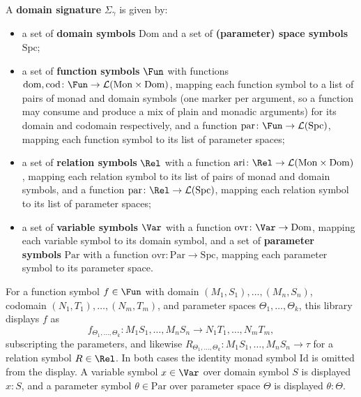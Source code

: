 \begin{definition}
\label{def:domain-signature}
\leanok
A \textbf{domain signature} $\Sigma_\gamma$ is given by:
\begin{itemize}
\item a set of \textbf{domain symbols} $\mathrm{Dom}$ and a set of
  \textbf{(parameter) space symbols} $\mathrm{Spc}$;
\item a set of \textbf{function symbols} $\Fun$ with functions
  $\mathrm{dom}, \mathrm{cod} \colon \Fun \to \mathcal L(\mathrm{Mon}
  \times \mathrm{Dom})$, mapping each function symbol to a list of pairs
  of monad and domain symbols (one marker per argument, so a function
  may consume and produce a mix of plain and monadic arguments) for
  its domain and codomain respectively, and a function
  $\mathrm{par} \colon \Fun \to \mathcal L(\mathrm{Spc})$, mapping each
  function symbol to its list of parameter spaces;
\item a set of \textbf{relation symbols} $\Rel$ with a function
  $\mathrm{ari} \colon \Rel \to \mathcal L(\mathrm{Mon} \times \mathrm{Dom})$,
  mapping each relation symbol to its list of pairs of monad and
  domain symbols, and a function
  $\mathrm{par} \colon \Rel \to \mathcal L(\mathrm{Spc})$, mapping each
  relation symbol to its list of parameter spaces;
\item a set of \textbf{variable symbols} $\Var$ with a function
  $\mathrm{ovr} \colon \Var \to \mathrm{Dom}$, mapping each variable symbol to
  its domain symbol, and a set of \textbf{parameter symbols}
  $\mathrm{Par}$ with a function
  $\mathrm{ovr} \colon \mathrm{Par} \to \mathrm{Spc}$, mapping each
  parameter symbol to its parameter space.
\end{itemize}
\end{definition}

\begin{definition}
\label{def:domain-signature-notation}
\leanok
For a function symbol $f \in \Fun$ with domain
$(M_1,S_1),\ldots,(M_n,S_n)$, codomain
$(N_1,T_1),\ldots,(N_m,T_m)$, and parameter spaces
$\Theta_1,\ldots,\Theta_k$, this library displays $f$ as
\[
  f_{\Theta_1,\ldots,\Theta_k} \colon M_1 S_1, \ldots, M_n S_n \to N_1 T_1, \ldots, N_m T_m,
\]
subscripting the parameters, and likewise
$R_{\Theta_1,\ldots,\Theta_k} \colon M_1 S_1, \ldots, M_n S_n \to \tau$
for a relation symbol $R \in \Rel$. In both cases the identity monad
symbol $\mathrm{Id}$ is omitted from the display. A variable symbol
$x \in \Var$ over domain symbol $S$ is displayed $x \colon S$, and a
parameter symbol $\theta \in \mathrm{Par}$ over parameter space
$\Theta$ is displayed $\theta \colon \Theta$.
\end{definition}


